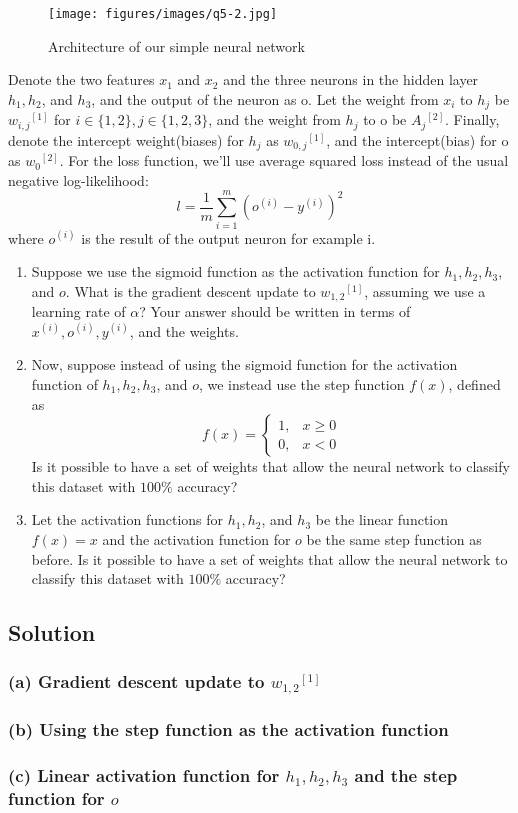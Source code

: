 \begin{figure}[htb]
    \centering
    \texttt{[image: figures/images/q5-2.jpg]}
    \caption{
        Architecture of our simple neural network
    }\label{fig:q5-2}
\end{figure}
Denote the two features \( x_{1} \) and \( x_{2} \) and the three neurons in the hidden layer \( h_{1}, h_{2} \), and \( h_{3} \), and the output of the neuron as o.
Let the weight from \( x_{i} \) to \( h_{j} \) be \( w_{i, j}{ }^{[1]} \) for \( i \in \{1,2\}, j \in \{1,2,3\} \), and the weight from \( h_{j} \) to o be \( A_{j}{ }^{[2]} \).
Finally, denote the intercept weight(biases) for \( h_{j} \) as \( w_{0, j}{ }^{[1]} \), and the intercept(bias) for o as \( w_{0}{ }^{[2]} \).
For the loss function, we'll use average squared loss instead of the usual negative log-likelihood:
\[
    l=\frac{1}{m} \sum_{i=1}^{m}\left(o^{(i)}-y^{(i)}\right)^{2}
\]
where \( o^{(i)} \) is the result of the output neuron for example i.
\begin{enumerate}[label= (\alph*), noitemsep, topsep=0pt]
    \item Suppose we use the sigmoid function as the activation function for \( h_{1}, h_{2}, h_{3} \), and \( o \).
          What is the gradient descent update to \( w_{1,2}{ }^{[1]} \), assuming we use a learning rate of \( \alpha \)?
          Your answer should be written in terms of \( x^{(i)}, o^{(i)}, y^{(i)} \), and the weights.

    \item Now, suppose instead of using the sigmoid function for the activation function of \( h_{1}, h_{2}, h_{3} \), and \( o \), we instead use the step function \( f(x) \), defined as
          \[
              f(x)= \begin{cases}1, & x \geq 0 \\ 0, & x<0\end{cases}
          \]
          Is it possible to have a set of weights that allow the neural network to classify this dataset with \( 100 \% \) accuracy?

    \item Let the activation functions for \( h_{1}, h_{2} \), and \( h_{3} \) be the linear function \( f(x)=x \) and the activation function for \( o \) be the same step function as before.
          Is it possible to have a set of weights that allow the neural network to classify this dataset with \( 100 \% \) accuracy?
\end{enumerate}

\subsection*{Solution}

\subsubsection*{(a) Gradient descent update to \( w_{1,2}{ }^{[1]} \)}

\subsubsection*{(b) Using the step function as the activation function}

\subsubsection*{(c) Linear activation function for \( h_{1}, h_{2}, h_{3} \) and the step function for \( o \)}
